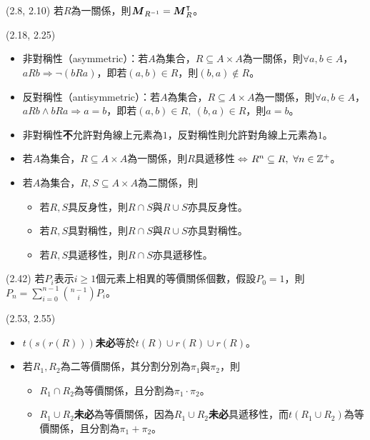 \item \begin{theorem}{(2.8, 2.10)} 若$R$為一關係，則$\boldsymbol{M}_{R^{-1}} = \boldsymbol{M}_{R}^\intercal$。
\end{theorem}

\item \begin{theorem}{(2.18, 2.25)} \quad\quad
    \begin{itemize}
        \item 非對稱性（asymmetric）：若$A$為集合，$R \subseteq A \times A$為一關係，則$\forall a, b \in A$，$aRb \Rightarrow \lnot(bRa)$，即若$(a, b) \in R$，則$(b, a) \notin R$。
        \item 反對稱性（antisymmetric）：若$A$為集合，$R \subseteq A \times A$為一關係，則$\forall a, b \in A$，$aRb \land bRa \Rightarrow a = b$，即若$(a, b) \in R, \ (b, a) \in R$，則$a = b$。
        \item 非對稱性\textbf{不}允許對角線上元素為$1$，反對稱性則允許對角線上元素為$1$。
        \item 若$A$為集合，$R \subseteq A \times A$為一關係，則$R$具遞移性$\iff$$R^n \subseteq R, \ \forall n \in \mathbb{Z}^+$。
        \item 若$A$為集合，$R, S \subseteq A \times A$為二關係，則
        \begin{itemize}
            \item 若$R, S$具反身性，則$R \cap S$與$R \cup S$亦具反身性。
            \item 若$R, S$具對稱性，則$R \cap S$與$R \cup S$亦具對稱性。
            \item 若$R, S$具遞移性，則$R \cap S$亦具遞移性。
        \end{itemize}
    \end{itemize}
\end{theorem}

\item \begin{theorem}{(2.42)} 若$P_i$表示$i \ge 1$個元素上相異的等價關係個數，假設$P_0 = 1$，則$P_n = \sum\limits_{i = 0}^{n - 1}\binom{n - 1}{i}P_i$。
\end{theorem}

\item \begin{theorem}{(2.53, 2.55)} \quad\quad
    \begin{itemize}
        \item $t(s(r(R)))$\textbf{未必}等於$t(R) \cup r(R) \cup r(R)$。
        \item 若$R_1, R_2$為二等價關係，其分割分別為$\pi_1$與$\pi_2$，則
            \begin{itemize}
                \item $R_1 \cap R_2$為等價關係，且分割為$\pi_1 \cdot \pi_2$。
                \item $R_1 \cup R_2$\textbf{未必}為等價關係，因為$R_1 \cup R_2$\textbf{未必}具遞移性，而$t(R_1 \cup R_2)$為等價關係，且分割為$\pi_1 + \pi_2$。
            \end{itemize}
    \end{itemize}
\end{theorem}

